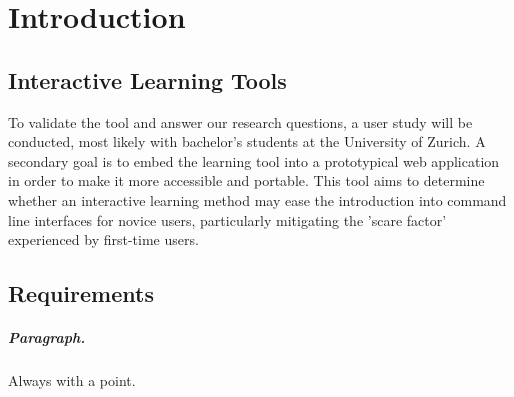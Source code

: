 \chapter{Introduction}
\label{chap:intro}


\section{Interactive Learning Tools}
To validate the tool and answer our
research questions, a user study will be conducted, most likely with bachelor's
students at the University of Zurich. A secondary goal is to embed the learning
tool into a prototypical web application in order to make it more accessible
and portable.
This tool aims to determine whether an interactive learning method may ease the
introduction into command line interfaces for novice users, particularly
mitigating the 'scare factor' experienced by first-time users. 

\section{Requirements}

\paragraph{Paragraph.} Always with a point.

